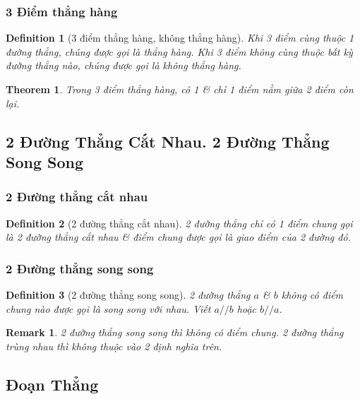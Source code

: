 \documentclass{article}
\numberwithin{equation}{section}
\newtheorem{definition}{Definition}[section]
\newtheorem{remark}{Remark}[section]
\newtheorem{theorem}{Theorem}[section]
\begin{document}
\subsubsection{3 Điểm thẳng hàng}

\begin{definition}[3 điểm thẳng hàng, không thẳng hàng]
	Khi 3 điểm cùng thuộc 1 đường thẳng, chúng được gọi là \emph{thẳng hàng}. Khi 3 điểm không cùng thuộc bất kỳ đường thẳng nào, chúng được gọi là \emph{không thẳng hàng}.
\end{definition}

\begin{theorem}
	Trong 3 điểm thẳng hàng, có 1 \textit{\&} chỉ 1 điểm nằm giữa 2 điểm còn lại.
\end{theorem}

\subsection{2 Đường Thẳng Cắt Nhau. 2 Đường Thẳng Song Song}

\subsubsection{2 Đường thẳng cắt nhau}

\begin{definition}[2 đường thẳng cắt nhau]
	2 đường thẳng chỉ có 1 điểm chung gọi là \emph{2 đường thẳng cắt nhau} \textit{\&} điểm chung được gọi là \emph{giao điểm} của 2 đường đó.
\end{definition}

\subsubsection{2 Đường thẳng song song}

\begin{definition}[2 đường thẳng song song]
	2 đường thẳng $a$ \textit{\&} $b$ không có điểm chung nào được gọi là \emph{song song với nhau}. Viết $a//b$ hoặc $b//a$.
\end{definition}

\begin{remark}
	2 đường thẳng song song thì không có điểm chung. 2 đường thẳng \emph{trùng nhau} thì không thuộc vào 2 định nghĩa trên.
\end{remark}

\subsection{Đoạn Thẳng}
\end{document}
